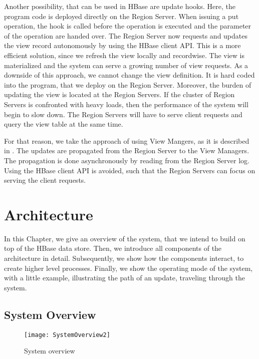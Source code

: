 \documentclass[11pt,a4paper,bibtotoc,idxtotoc,headsepline,footsepline,footexclude,BCOR12mm,DIV13]{scrbook}
\begin{document}
Another possibility, that can be used in HBase are update hooks. Here, the program code is deployed directly on the Region Server. When issuing a put operation, the hook is called before the operation is executed and the parameter of the operation are handed over. The Region Server now requests and updates the view record autonomously by using the HBase client API. This is a more efficient solution, since we refresh the view locally and recordwise. The view is materialized and the system can serve a growing number of view requests. As a downside of this approach, we cannot change the view definition. It is hard coded into the program, that we deploy on the Region Server. Moreover, the burden of updating the view is located at the Region Servers. If the cluster of Region Servers is confronted with heavy loads, then the performance of the system will begin to slow down. The Region Servers will have to serve client requests and query the view table at the same time. 

For that reason, we take the approach of using View Mangers, as it is described in \cite{jacobsen:viewmaintenance}. The updates are propagated from the Region Server to the View Managers. The propagation is done asynchronously by reading from the Region Server log. Using the HBase client API is avoided, such that the Region Servers can focus on serving the client requests. 


\chapter{Architecture}
\label{chap:architecture}

In this Chapter, we give an overview of the system, that we intend to build on top of the HBase data store.  Then, we introduce all components of the architecture in detail. Subsequently, we show how the components interact, to create higher level processes. Finally, we show the operating mode of the system, with a little example, illustrating the path of an update, traveling through the system.



\section{System Overview}
\begin{figure}[h!]
  
  \centering
    \texttt{[image: SystemOverview2]}
    \caption{System overview}
    \label{fig:systemoverview}
\end{figure}
\end{document}
